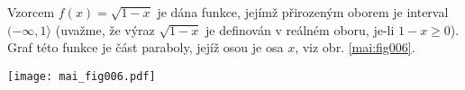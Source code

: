 \wikitextrule
\begin{example}\label{MAI:exam018} 
  Vzorcem $f(x)=\sqrt{1-x}$ je dána funkce, jejímž přirozeným oborem je interval 
  $(-\infty,1\rangle$ (uvažme, že výraz $\sqrt{1-x}$ je definován v reálném oboru, je-li 
  $1-x\geq0$). Graf této funkce je část paraboly, jejíž osou je osa $x$, viz obr. 
  \ref{mai:fig006}.
  
  {\centering
   \captionsetup{type=figure}
%  
   \texttt{[image: mai\_fig006.pdf]}
   \label{mai:fig006}
   \par}

\end{example}